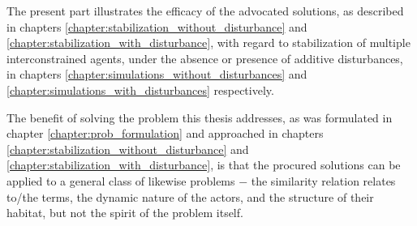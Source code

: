 The present part illustrates the efficacy of the advocated solutions, as
described in chapters \ref{chapter:stabilization_without_disturbance} and
\ref{chapter:stabilization_with_disturbance}, with regard to stabilization
of multiple interconstrained agents, under the absence or presence
of additive disturbances, in chapters
\ref{chapter:simulations_without_disturbances} and
\ref{chapter:simulations_with_disturbances} respectively.

The benefit of solving the problem this thesis addresses, as was formulated in
chapter \ref{chapter:prob_formulation} and approached in chapters
\ref{chapter:stabilization_without_disturbance} and
\ref{chapter:stabilization_with_disturbance}, is that the procured solutions can
be applied to a general class of likewise problems $-$ the similarity relation
relates to/the terms, the dynamic nature of the actors, and the structure of
their habitat, but not the spirit of the problem itself.
